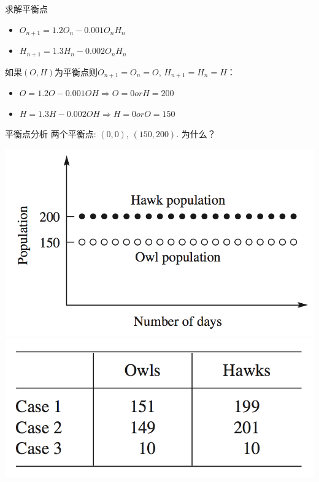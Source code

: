 \documentclass[UTF8]{ctexbeamer}
\begin{document}
\begin{frame}{求解平衡点}
  \begin{definition}
    \begin{itemize}
    \item $O_{n+1}=1.2O_n - 0.001O_nH_n$
    \item $H_{n+1}=1.3H_n - 0.002O_nH_n$
    \end{itemize}
  \end{definition}

  如果$(O,H)$为平衡点则$O_{n+1}=O_n=O$, $H_{n+1}=H_n=H$：

  \begin{itemize}
  \item $O=1.2O - 0.001OH \Rightarrow O = 0 or H = 200$ 
  \item $H=1.3H - 0.002OH \Rightarrow H = 0 or O = 150$
  \end{itemize}

\end{frame}

\begin{frame}{平衡点分析}
  两个平衡点: $(0, 0)$, $(150, 200)$. 为什么？

  \begin{center}
    \includegraphics[width=.4\textwidth{}]{owl.png}
    \includegraphics[height=.2\textwidth{}]{owl-start.png}
  \end{center}  

\end{frame}
\end{document}
